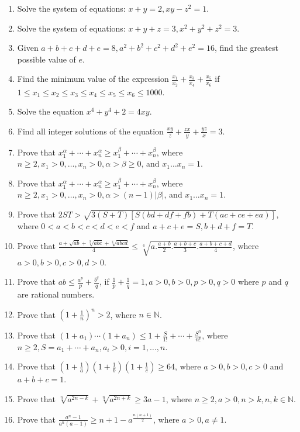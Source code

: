 \begin{enumerate}
\item Solve the system of equations: $x + y = 2, xy - z^2 = 1$.
\item Solve the system of equations: $x + y + z = 3, x^2 + y^2 + z^2 = 3$.
\item Given $a + b + c + d + e = 8, a^2 + b^2 + c^2 + d^2 + e^2 = 16$, find the greatest possible value of $e$.
\item Find the minimum value of the expression $\frac{x_1}{x_2} + \frac{x_3}{x_4} + \frac{x_5}{x_6}$ if $1\leq x_1\leq x_2\leq
  x_3\leq x_4\leq x_5\leq x_6\leq 1000$.
\item Solve the equation $x^4 + y^4 + 2 = 4xy$.
\item Find all integer solutions of the equation $\frac{xy}{z} + \frac{zx}{y} + \frac{yz}{x} = 3$.
\item Prove that $x_1^\alpha + \cdots + x_n^\alpha\geq x_1^\beta + \cdots + x_n^\beta$, where $n\geq 2, x_1 > 0, \ldots, x_n > 0,
  \alpha >\beta\geq 0$, and $x_1\ldots x_n = 1$.
\item Prove that $x_1^\alpha + \cdots + x_n^\alpha\geq x_1^\beta + \cdots + x_n^\beta$, where $n\geq 2, x_1 > 0, \ldots, x_n > 0,
  \alpha >(n - 1)|\beta|$, and $x_1\ldots x_n = 1$.
\item Prove that $2ST > \sqrt{3(S + T)[S(bd + df + fb) + T(ac + ce + ea)]}$, where $0 < a < b < c < d < e < f$ and $a + c + e = S,
  b + d + f = T$.
\item Prove that $\frac{a + \sqrt{ab} + \sqrt[3]{abc} + \sqrt[4]{abcd}}{4} \leq \sqrt[4]{a . \frac{a + b}{2} . \frac{a + b + c}{3}
  . \frac{a + b + c + d}{4}}$, where $a > 0, b > 0, c > 0, d > 0$.
\item Prove that $ab \leq \frac{a^p}{p} + \frac{b^q}{q}$, if $\frac{1}{p} + \frac{1}{q} = 1, a > 0, b > 0, p > 0, q > 0$ where $p$
  and $q$ are rational numbers.
\item Prove that $\left(1 + \frac{1}{n}\right)^n > 2$, where $n\in \mathbb{N}$.
\item Prove that $(1 + a_1)\cdots(1 + a_n)\leq 1 + \frac{S}{1!} + \cdots + \frac{S^n}{n!}$, where $n\geq 2, S = a_1 + \cdots + a_n,
  a_i > 0, i = 1, \ldots, n$.
\item Prove that $\left(1 + \frac{1}{a}\right)\left(1 + \frac{1}{b}\right)\left(1 + \frac{1}{c}\right)\geq 64$, where $a > 0, b >
  0, c > 0$ and $a + b + c = 1$.
\item Prove that $\sqrt[n]{a^{2n - k}} + \sqrt[n]{a^{2n + k}}\geq 3a - 1$, where $n\geq 2, a > 0, n > k, n, k\in\mathbb{N}$.
\item Prove that $\frac{a^n - 1}{a^n(a - 1)}\geq n + 1 - a^{\tfrac{n(n + 1)}{2}}$, where $a > 0, a \neq 1$.

\end{enumerate}
